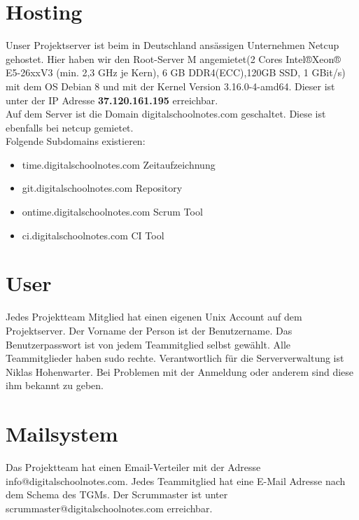 \documentclass[12pt,a4paper,oneside,ngerman]{scrartcl}
\begin{document}
\justify
\section{Hosting}
Unser Projektserver ist beim in Deutschland ansässigen Unternehmen Netcup\cite{NETCUP:1} gehostet. Hier haben wir den Root-Server M angemietet(2 Cores Intel®Xeon® E5-26xxV3
(min. 2,3 GHz je Kern), 6 GB DDR4(ECC),120GB SSD, 1 GBit/s)\cite{NETCUP:2} mit dem OS Debian 8 und mit der Kernel Version 3.16.0-4-amd64. Dieser ist unter der IP Adresse \textbf{37.120.161.195} erreichbar.\\

Auf dem Server ist die Domain digitalschoolnotes.com geschaltet. Diese ist ebenfalls bei netcup gemietet.\\

Folgende Subdomains existieren:

\begin{itemize}
\item time.digitalschoolnotes.com \hfill Zeitaufzeichnung
\item git.digitalschoolnotes.com \hfill Repository
\item ontime.digitalschoolnotes.com \hfill Scrum Tool
\item ci.digitalschoolnotes.com \hfill CI Tool
\end{itemize}

\section{User}
Jedes Projektteam Mitglied hat einen eigenen Unix Account auf dem Projektserver. Der Vorname der Person ist der Benutzername. Das Benutzerpasswort ist von jedem Teammitglied selbst gewählt. Alle Teammitglieder haben sudo rechte. Verantwortlich für die Serververwaltung ist Niklas Hohenwarter. Bei Problemen mit der Anmeldung oder anderem sind diese ihm bekannt zu geben.

\section{Mailsystem}
Das Projektteam hat einen Email-Verteiler mit der Adresse info@digitalschoolnotes.com. Jedes Teammitglied hat eine E-Mail Adresse nach dem Schema des TGMs. Der Scrummaster ist unter scrummaster@digitalschoolnotes.com erreichbar.
\end{document}
